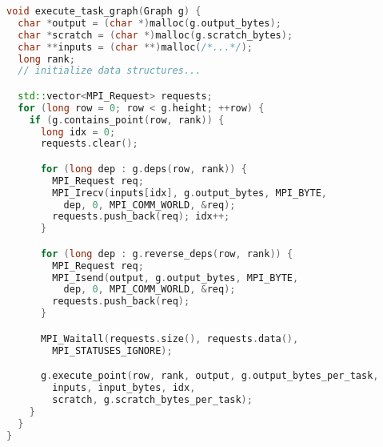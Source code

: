 \begin{lstlisting}[language=C++,caption={Excerpt from Task Bench implementation in MPI.},label={lst:code-sample},style=codeblock,float]
void execute_task_graph(Graph g) {
  char *output = (char *)malloc(g.output_bytes);
  char *scratch = (char *)malloc(g.scratch_bytes);
  char **inputs = (char **)malloc(/*...*/);
  long rank;
  // initialize data structures...

  std::vector<MPI_Request> requests;
  for (long row = 0; row < g.height; ++row) {
    if (g.contains_point(row, rank)) {
      long idx = 0;
      requests.clear();

      for (long dep : g.deps(row, rank)) {
        MPI_Request req;
        MPI_Irecv(inputs[idx], g.output_bytes, MPI_BYTE,
          dep, 0, MPI_COMM_WORLD, &req);
        requests.push_back(req); idx++;
      }

      for (long dep : g.reverse_deps(row, rank)) {
        MPI_Request req;
        MPI_Isend(output, g.output_bytes, MPI_BYTE,
          dep, 0, MPI_COMM_WORLD, &req);
        requests.push_back(req);
      }

      MPI_Waitall(requests.size(), requests.data(),
        MPI_STATUSES_IGNORE);

      g.execute_point(row, rank, output, g.output_bytes_per_task,
        inputs, input_bytes, idx,
        scratch, g.scratch_bytes_per_task);
    }
  }
}
\end{lstlisting}
